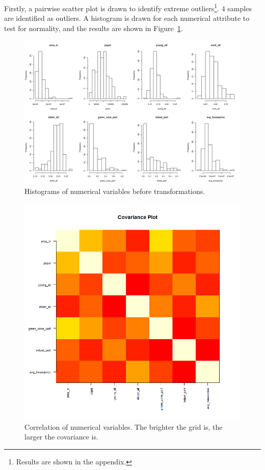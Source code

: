 \documentclass{article}
\begin{document}
Firstly, a pairwise scatter plot is drawn to identify extreme outliers\footnote{Results are shown in the appendix.}. 4 samples are identified as outliers. A histogram is drawn for each numerical attribute to test for normality, and the results are shown in Figure~\ref{fig1}.

\begin{figure}[ht]
\vskip 0.2in
\begin{center}
\centerline{\includegraphics[width=\columnwidth]{numer_hists}}
\caption{Histograms of numerical variables before transformations.}
\label{fig1}
\end{center}
\vskip -0.2in
\end{figure}

\begin{figure}[ht]
\vskip 0.2in
\begin{center}
\centerline{\includegraphics[width=\columnwidth]{cov_plot}}
\caption{Correlation of numerical variables. The brighter the grid is, the larger the covariance is.}
\label{fig2}
\end{center}
\vskip -0.2in
\end{figure}
\end{document}
